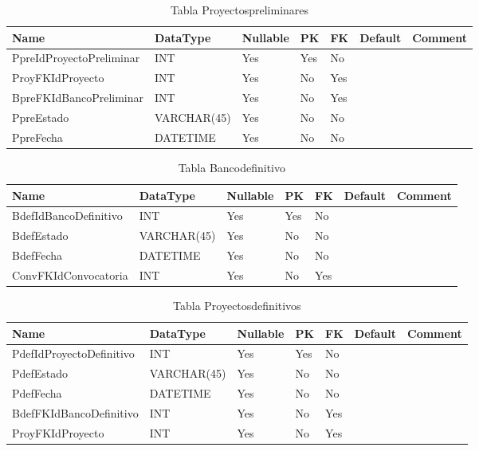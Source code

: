 \begin{table}
	\caption{Tabla Proyectospreliminares}
	\label{labelTableProyectospreliminares}
	\begin{tabular}{ |l|l|l|l|l|l|l| }
		\hline
		Name & DataType & Nullable & PK & FK & Default & Comment \\ \hline
		PpreIdProyectoPreliminar & INT & Yes & Yes & No &  & \\ \hline 
		ProyFKIdProyecto & INT & Yes & No & Yes &  & \\ \hline 
		BpreFKIdBancoPreliminar & INT & Yes & No & Yes &  & \\ \hline 
		PpreEstado & VARCHAR(45) & Yes & No & No &  & \\ \hline 
		PpreFecha & DATETIME & Yes & No & No &  & \\ \hline 
		
	\end{tabular}
\end{table}


\begin{table}
	\caption{Tabla Bancodefinitivo}
	\label{labelTableBancodefinitivo}
	\begin{tabular}{ |l|l|l|l|l|l|l| }
		\hline
		Name & DataType & Nullable & PK & FK & Default & Comment \\ \hline
		BdefIdBancoDefinitivo & INT & Yes & Yes & No &  & \\ \hline 
		BdefEstado & VARCHAR(45) & Yes & No & No &  & \\ \hline 
		BdefFecha & DATETIME & Yes & No & No &  & \\ \hline 
		ConvFKIdConvocatoria & INT & Yes & No & Yes &  & \\ \hline 
		
	\end{tabular}
\end{table}


\begin{table}
	\caption{Tabla Proyectosdefinitivos}
	\label{labelTableProyectosdefinitivos}
	\begin{tabular}{ |l|l|l|l|l|l|l| }
		\hline
		Name & DataType & Nullable & PK & FK & Default & Comment \\ \hline
		PdefIdProyectoDefinitivo & INT & Yes & Yes & No &  & \\ \hline 
		PdefEstado & VARCHAR(45) & Yes & No & No &  & \\ \hline 
		PdefFecha & DATETIME & Yes & No & No &  & \\ \hline 
		BdefFKIdBancoDefinitivo & INT & Yes & No & Yes &  & \\ \hline 
		ProyFKIdProyecto & INT & Yes & No & Yes &  & \\ \hline 
		
	\end{tabular}
\end{table}


